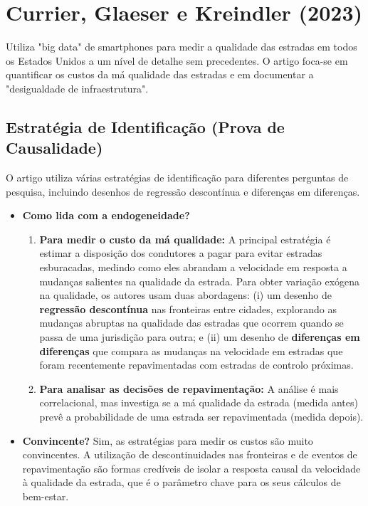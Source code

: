 \documentclass[12pt, a4paper]{article}
\begin{document}
\section{Currier, Glaeser e Kreindler (2023)}
Utiliza "big data" de smartphones para medir a qualidade das estradas em todos os Estados Unidos a um nível de detalhe sem precedentes. O artigo foca-se em quantificar os custos da má qualidade das estradas e em documentar a "desigualdade de infraestrutura".

\subsection{Estratégia de Identificação (Prova de Causalidade)}
O artigo utiliza várias estratégias de identificação para diferentes perguntas de pesquisa, incluindo desenhos de regressão descontínua e diferenças em diferenças.

\begin{itemize}
    \item \textbf{Como lida com a endogeneidade?}
        \begin{enumerate}
            \item \textbf{Para medir o custo da má qualidade:} A principal estratégia é estimar a disposição dos condutores a pagar para evitar estradas esburacadas, medindo como eles abrandam a velocidade em resposta a mudanças salientes na qualidade da estrada. Para obter variação exógena na qualidade, os autores usam duas abordagens: (i) um desenho de \textbf{regressão descontínua} nas fronteiras entre cidades, explorando as mudanças abruptas na qualidade das estradas que ocorrem quando se passa de uma jurisdição para outra; e (ii) um desenho de \textbf{diferenças em diferenças} que compara as mudanças na velocidade em estradas que foram recentemente repavimentadas com estradas de controlo próximas.
            \item \textbf{Para analisar as decisões de repavimentação:} A análise é mais correlacional, mas investiga se a má qualidade da estrada (medida antes) prevê a probabilidade de uma estrada ser repavimentada (medida depois).
        \end{enumerate}
    \item \textbf{Convincente?} Sim, as estratégias para medir os custos são muito convincentes. A utilização de descontinuidades nas fronteiras e de eventos de repavimentação são formas credíveis de isolar a resposta causal da velocidade à qualidade da estrada, que é o parâmetro chave para os seus cálculos de bem-estar.
\end{itemize}
\end{document}
